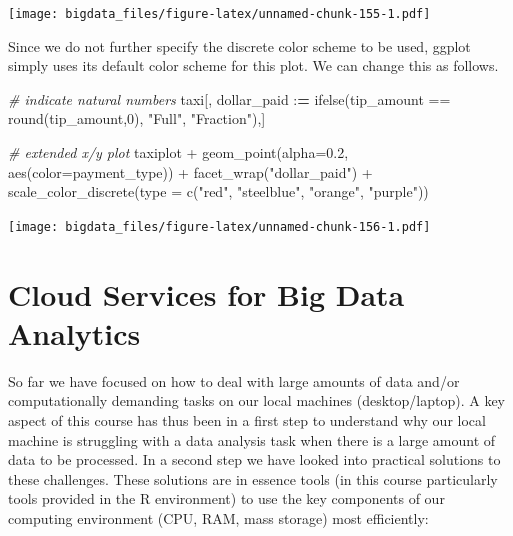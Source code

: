 \documentclass[
  12pt,
]{style/krantz}
\newenvironment{Shaded}{\begin{snugshade}}{\end{snugshade}}
\newcommand{\AttributeTok}[1]{\textcolor[rgb]{0.77,0.63,0.00}{#1}}
\newcommand{\CommentTok}[1]{\textcolor[rgb]{0.56,0.35,0.01}{\textit{#1}}}
\newcommand{\DecValTok}[1]{\textcolor[rgb]{0.00,0.00,0.81}{#1}}
\newcommand{\ErrorTok}[1]{\textcolor[rgb]{0.64,0.00,0.00}{\textbf{#1}}}
\newcommand{\FloatTok}[1]{\textcolor[rgb]{0.00,0.00,0.81}{#1}}
\newcommand{\FunctionTok}[1]{\textcolor[rgb]{0.00,0.00,0.00}{#1}}
\newcommand{\NormalTok}[1]{#1}
\newcommand{\SpecialCharTok}[1]{\textcolor[rgb]{0.00,0.00,0.00}{#1}}
\newcommand{\StringTok}[1]{\textcolor[rgb]{0.31,0.60,0.02}{#1}}
\begin{document}
\texttt{[image: bigdata\_files/figure-latex/unnamed-chunk-155-1.pdf]}

Since we do not further specify the discrete color scheme to be used, ggplot simply uses its default color scheme for this plot. We can change this as follows.

\begin{Shaded}
\begin{Highlighting}[]
\CommentTok{\# indicate natural numbers}
\NormalTok{taxi[, dollar\_paid }\SpecialCharTok{:}\ErrorTok{=} \FunctionTok{ifelse}\NormalTok{(tip\_amount }\SpecialCharTok{==} \FunctionTok{round}\NormalTok{(tip\_amount,}\DecValTok{0}\NormalTok{), }\StringTok{"Full"}\NormalTok{, }\StringTok{"Fraction"}\NormalTok{),]}


\CommentTok{\# extended x/y plot}
\NormalTok{taxiplot }\SpecialCharTok{+}
     \FunctionTok{geom\_point}\NormalTok{(}\AttributeTok{alpha=}\FloatTok{0.2}\NormalTok{, }\FunctionTok{aes}\NormalTok{(}\AttributeTok{color=}\NormalTok{payment\_type)) }\SpecialCharTok{+}
     \FunctionTok{facet\_wrap}\NormalTok{(}\StringTok{"dollar\_paid"}\NormalTok{) }\SpecialCharTok{+}
     \FunctionTok{scale\_color\_discrete}\NormalTok{(}\AttributeTok{type =} \FunctionTok{c}\NormalTok{(}\StringTok{"red"}\NormalTok{, }\StringTok{"steelblue"}\NormalTok{, }\StringTok{"orange"}\NormalTok{, }\StringTok{"purple"}\NormalTok{))}
\end{Highlighting}
\end{Shaded}

\texttt{[image: bigdata\_files/figure-latex/unnamed-chunk-156-1.pdf]}

\hypertarget{cloud-services-for-big-data-analytics}{%
\chapter{Cloud Services for Big Data Analytics}\label{cloud-services-for-big-data-analytics}}

So far we have focused on how to deal with large amounts of data and/or computationally demanding tasks on our local machines (desktop/laptop). A key aspect of this course has thus been in a first step to understand why our local machine is struggling with a data analysis task when there is a large amount of data to be processed. In a second step we have looked into practical solutions to these challenges. These solutions are in essence tools (in this course particularly tools provided in the R environment) to use the key components of our computing environment (CPU, RAM, mass storage) most efficiently:
\end{document}
